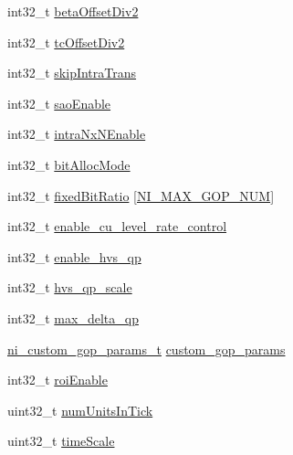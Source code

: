 \begin{DoxyCompactItemize}
\item 
int32\+\_\+t \mbox{\hyperlink{struct__ni__t408__config__t_a4025d29cf80610df5b8debd77941bba1}{beta\+Offset\+Div2}}
\item 
int32\+\_\+t \mbox{\hyperlink{struct__ni__t408__config__t_a5f2f5aa936c6d5e154457c67a8686b11}{tc\+Offset\+Div2}}
\item 
int32\+\_\+t \mbox{\hyperlink{struct__ni__t408__config__t_aebe9b535ea2f741db2c160ccd68061bf}{skip\+Intra\+Trans}}
\item 
int32\+\_\+t \mbox{\hyperlink{struct__ni__t408__config__t_a6d4631089bf8d8cac1a887c3ed10bd8d}{sao\+Enable}}
\item 
int32\+\_\+t \mbox{\hyperlink{struct__ni__t408__config__t_a22a0ae7af1f32d0bbbc6ecd0bcee4b2d}{intra\+Nx\+N\+Enable}}
\item 
int32\+\_\+t \mbox{\hyperlink{struct__ni__t408__config__t_a6346a66e3a3e2a1b68f8c6fd8e9e4ef3}{bit\+Alloc\+Mode}}
\item 
int32\+\_\+t \mbox{\hyperlink{struct__ni__t408__config__t_a353df24b5bd189d29cd18a776dbda11d}{fixed\+Bit\+Ratio}} \mbox{[}\mbox{\hyperlink{ni__device__api_8h_a4fdb37034e4182c47a5c5e46a1385ff0}{N\+I\+\_\+\+M\+A\+X\+\_\+\+G\+O\+P\+\_\+\+N\+UM}}\mbox{]}
\item 
int32\+\_\+t \mbox{\hyperlink{struct__ni__t408__config__t_a1d42364a75135b48b08cf33e41f153d7}{enable\+\_\+cu\+\_\+level\+\_\+rate\+\_\+control}}
\item 
int32\+\_\+t \mbox{\hyperlink{struct__ni__t408__config__t_a5737df785999ec5915aa5b7d66842456}{enable\+\_\+hvs\+\_\+qp}}
\item 
int32\+\_\+t \mbox{\hyperlink{struct__ni__t408__config__t_a821d5b82e11f8ba2e7fee3cbea45ae70}{hvs\+\_\+qp\+\_\+scale}}
\item 
int32\+\_\+t \mbox{\hyperlink{struct__ni__t408__config__t_a8f44c3ec7a96e9c82494a7bc6d615cd6}{max\+\_\+delta\+\_\+qp}}
\item 
\mbox{\hyperlink{ni__device__api_8h_aa270bcddd5fd34880207abe21ac6ce31}{ni\+\_\+custom\+\_\+gop\+\_\+params\+\_\+t}} \mbox{\hyperlink{struct__ni__t408__config__t_a527c5bcdee05a1fe4ec5d8493aa5c795}{custom\+\_\+gop\+\_\+params}}
\item 
int32\+\_\+t \mbox{\hyperlink{struct__ni__t408__config__t_af75c3567740c6fbc3baa8c4c72fd0df7}{roi\+Enable}}
\item 
uint32\+\_\+t \mbox{\hyperlink{struct__ni__t408__config__t_aca700eee67b3ca184301cdc6816f42f0}{num\+Units\+In\+Tick}}
\item 
uint32\+\_\+t \mbox{\hyperlink{struct__ni__t408__config__t_a933267547c8476b080cc2042812c703f}{time\+Scale}}

\end{DoxyCompactItemize}
